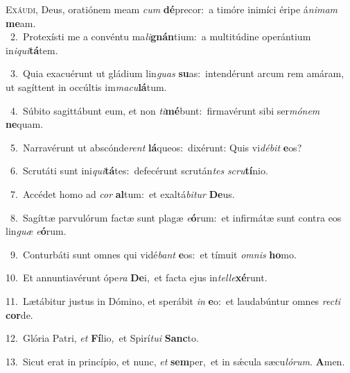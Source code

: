\lettrine{\initial\textcolor{\initialcolor}{E}}{xáudi,} Deus, oratiónem meam \textit{cum} \textbf{dé}\-precor:~\star a timóre inimíci éripe á\-\textit{ni}\-\textit{mam} \textbf{me}\-am.\\
{\numbfont\textcolor{\numbcolor}{~2.}}~Protexísti me a convéntu ma\-\textit{li}\-\textbf{gnán}tium:~\star a multitúdine operántium in\-\textit{i}\-\textit{qui}\textbf{tá}tem.\par
{\numbfont\textcolor{\numbcolor}{~3.}}~Quia exacuérunt ut gládium lin\textit{guas} \textbf{su}\-as:~\star intendérunt arcum rem amáram, ut sagíttent in occúltis im\-\textit{ma}\-\textit{cu}\textbf{lá}tum.\par
{\numbfont\textcolor{\numbcolor}{~4.}}~Súbito sagittábunt eum, et non \textit{ti}\-\textbf{mé}bunt:~\star firmavérunt sibi ser\-\textit{mó}\-\textit{nem} \textbf{ne}\-quam.\par
{\numbfont\textcolor{\numbcolor}{~5.}}~Narravérunt ut abscónde\textit{rent} \textbf{lá}\-queos:~\star dixérunt: Quis vi\-\textit{dé}\-\textit{bit} \textbf{e}\-os?\par
{\numbfont\textcolor{\numbcolor}{~6.}}~Scrutáti sunt ini\-\textit{qui}\-\textbf{tá}tes:~\star defecérunt scrután\textit{tes} \textit{scru}\-\textbf{tí}nio.\par
{\numbfont\textcolor{\numbcolor}{~7.}}~Accédet homo ad \textit{cor} \textbf{al}\-tum:~\star et exaltá\-\textit{bi}\-\textit{tur} \textbf{De}\-us.\par
{\numbfont\textcolor{\numbcolor}{~8.}}~Sagíttæ parvulórum factæ sunt plagæ \textit{e}\-\textbf{ó}rum:~\star et infirmátæ sunt contra eos lin\textit{guæ} \textit{e}\-\textbf{ó}rum.\par
{\numbfont\textcolor{\numbcolor}{~9.}}~Conturbáti sunt omnes qui vidé\textit{bant} \textbf{e}\-os:~\star et tímuit \textit{om}\-\textit{nis} \textbf{ho}\-mo.\par
{\numbfont\textcolor{\numbcolor}{10.}}~Et annuntiavérunt ópe\textit{ra} \textbf{De}\-i,~\star et facta ejus in\-\textit{tel}\-\textit{le}\textbf{xé}runt.\par
{\numbfont\textcolor{\numbcolor}{11.}}~Lætábitur justus in Dómino, et sperábit \textit{in} \textbf{e}\-o:~\star et laudabúntur omnes \textit{rec}\-\textit{ti} \textbf{cor}\-de.\par
{\numbfont\textcolor{\numbcolor}{12.}}~Glória Patri, \textit{et} \textbf{Fí}\-lio,~\star et Spirí\-\textit{tu}\-\textit{i} \textbf{Sanc}\-to.\par
{\numbfont\textcolor{\numbcolor}{13.}}~Sicut erat in princípio, et nunc, \textit{et} \textbf{sem}\-per,~\star et in sǽcula sæcu\-\textit{ló}\-\textit{rum}. \textbf{A}\-men.\par
